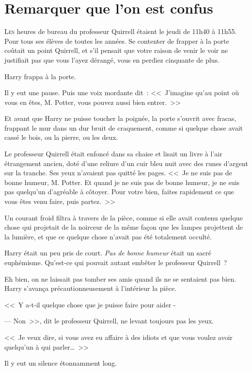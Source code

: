 \chapter{Remarquer que l'on est confus}

\lettrine{L}{es} heures de bureau du professeur Quirrell étaient le jeudi de 11h40 à 11h55. Pour tous ses élèves de toutes les années. Se contenter de frapper à la porte coûtait un point Quirrell, et s'il pensait que votre raison de venir le voir ne justifiait pas que vous l'ayez dérangé, vous en perdiez cinquante de plus.

Harry frappa à la porte.

Il y eut une pause. Puis une voix mordante dit~: <<~J'imagine qu'au point où vous en êtes, M. Potter, vous pouvez aussi bien entrer.~>>

Et avant que Harry ne puisse toucher la poignée, la porte s'ouvrit avec fracas, frappant le mur dans un dur bruit de craquement, comme si quelque chose avait cassé le bois, ou la pierre, ou les deux.

Le professeur Quirrell était enfoncé dans sa chaise et lisait un livre à l'air étrangement ancien, doté d'une reliure d'un cuir bleu nuit avec des runes d'argent sur la tranche. Ses yeux n'avaient pas quitté les pages. <<~Je ne suis pas de bonne humeur, M. Potter. Et quand je ne suis pas de bonne humeur, je ne suis pas quelqu'un d'agréable à côtoyer. Pour votre bien, faites rapidement ce que vous êtes venu faire, puis partez.~>>

Un courant froid filtra à travers de la pièce, comme si elle avait contenu quelque chose qui projetait de la noirceur de la même façon que les lampes projettent de la lumière, et que ce quelque chose n'avait pas été totalement occulté.

Harry était un peu pris de court. \emph{Pas de bonne humeur} était un sacré euphémisme. Qu'est-ce qui pouvait autant embêter le professeur Quirrell~?

Eh bien, on ne laissait pas tomber ses amis quand ils ne se sentaient pas bien. Harry s'avança précautionneusement à l'intérieur la pièce.

<<~Y a-t-il quelque chose que je puisse faire pour aider -

--- Non~>>, dit le professeur Quirrell, ne levant toujours pas les yeux.

<<~Je veux dire, si vous avez eu affaire à des idiots et que vous voulez avoir quelqu'un à qui parler…~>>

Il y eut un silence étonnamment long.

